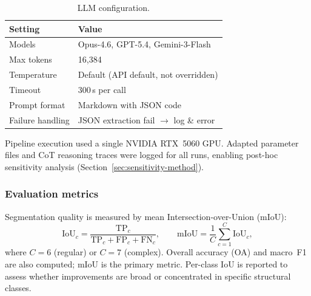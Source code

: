 \documentclass[a4paper,fleqn]{cas-dc}
\begin{document}
\begin{table}[ht]
\caption{LLM configuration.}\label{tab:llm-config}
\begin{tabular*}{\tblwidth}{@{} l l @{}}
\toprule
Setting & Value \\
\midrule
Models & Opus-4.6, GPT-5.4, Gemini-3-Flash \\
Max tokens & 16{,}384 \\
Temperature & Default (API default, not overridden) \\
Timeout & 300\,s per call \\
Prompt format & Markdown with JSON code \\
Failure handling & JSON extraction fail $\rightarrow$ log \& error \\
\bottomrule
\end{tabular*}
\end{table}



Pipeline execution used a single NVIDIA RTX~5060 GPU. Adapted parameter files and CoT reasoning traces were logged for all runs, enabling post-hoc sensitivity analysis (Section~\ref{sec:sensitivity-method}).

\subsubsection{Evaluation metrics}\label{sec:metrics}

Segmentation quality is measured by mean Intersection-over-Union (mIoU):
\begin{equation}
\text{IoU}_c = \frac{\text{TP}_c}{\text{TP}_c + \text{FP}_c + \text{FN}_c}, \qquad
\text{mIoU} = \frac{1}{C} \sum_{c=1}^{C} \text{IoU}_c,
\end{equation}
where $C = 6$ (regular) or $C = 7$ (complex). Overall accuracy (OA) and macro~F1 are also computed; mIoU is the primary metric. Per-class IoU is reported to assess whether improvements are broad or concentrated in specific structural classes.
\end{document}
